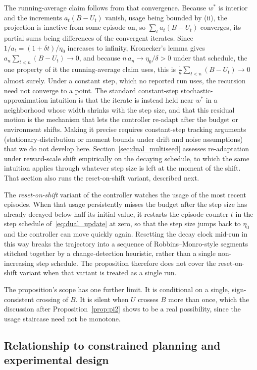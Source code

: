 The running-average claim follows from that convergence. Because $w^*$ is interior and the increments $a_t (B - U_t)$ vanish, usage being bounded by (ii), the projection is inactive from some episode on, so $\sum_t a_t (B - U_t)$ converges, its partial sums being differences of the convergent iterates. Since $1/a_t = (1 + \delta t)/\eta_0$ increases to infinity, Kronecker's lemma gives $a_n \sum_{t<n} (B - U_t) \to 0$, and because $n\,a_n \to \eta_0/\delta > 0$ under that schedule, the one property of it the running-average claim uses, this is $\frac{1}{n}\sum_{t<n} (B - U_t) \to 0$ almost surely. Under a constant step, which no reported run uses, the recursion need not converge to a point. The standard constant-step stochastic-approximation intuition is that the iterate is instead held near $w^*$ in a neighborhood whose width shrinks with the step size, and that this residual motion is the mechanism that lets the controller re-adapt after the budget or environment shifts. Making it precise requires constant-step tracking arguments (stationary-distribution or moment bounds under drift and noise assumptions) that we do not develop here. Section~\ref{sec:dual_multiseed} assesses re-adaptation under reward-scale shift empirically on the decaying schedule, to which the same intuition applies through whatever step size is left at the moment of the shift. That section also runs the reset-on-shift variant, described next.

The \emph{reset-on-shift} variant of the controller watches the usage of the most recent episodes. When that usage persistently misses the budget after the step size has already decayed below half its initial value, it restarts the episode counter $t$ in the step schedule of~\eqref{eq:dual_update} at zero, so that the step size jumps back to $\eta_0$ and the controller can move quickly again. Resetting the decay clock mid-run in this way breaks the trajectory into a sequence of Robbins--Monro-style segments stitched together by a change-detection heuristic, rather than a single non-increasing step schedule. The proposition therefore does not cover the reset-on-shift variant when that variant is treated as a single run.

The proposition's scope has one further limit. It is conditional on a single, sign-consistent crossing of $B$. It is silent when $U$ crosses $B$ more than once, which the discussion after Proposition~\ref{prop:pi2} shows to be a real possibility, since the usage staircase need not be monotone.

\subsection{Relationship to constrained planning and experimental design}
\label{app:theory_positioning}

